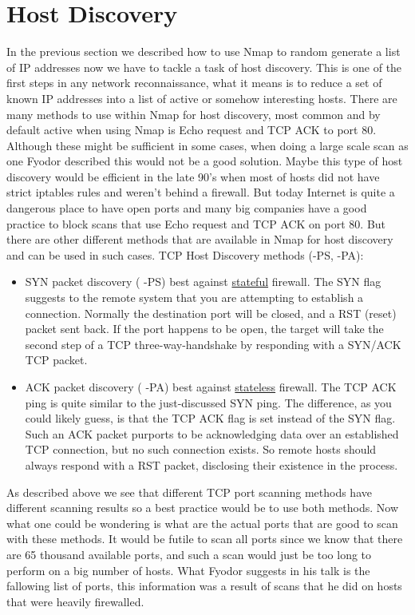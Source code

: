 \documentclass[times, utf8, seminar,english]{fer}
\begin{document}
\section{Host Discovery}
In the previous section we described how to use Nmap to random generate a list of IP addresses now we have to tackle a task of host discovery. This is one of the first steps in any network reconnaissance, what it means is to reduce a set of known IP addresses into a list of active or somehow interesting hosts. There are many methods to use within Nmap for host discovery, most common and by default active when using Nmap is Echo request and TCP ACK to port 80. Although these might be sufficient in some cases, when doing a large scale scan as one Fyodor described this would not be a good solution. Maybe this type of host discovery would be efficient in the late 90's when most of hosts did not have strict iptables rules and weren't behind a firewall. But today Internet is quite a dangerous place to have open ports and many big companies have a good practice to block scans that use Echo request and TCP ACK on port 80. But there are other different methods that are available in Nmap for host discovery and can be used in such cases. 
\newline\newline TCP Host Discovery methods (-PS, -PA):
\begin{itemize}
	\item SYN packet discovery ( -PS) best against \underline{stateful} firewall. The SYN flag suggests to the remote system that you are attempting to establish a connection. Normally the destination port will be closed, and a RST (reset) packet sent back. If the port happens to be open, the target will take the second step of a TCP three-way-handshake by responding with a SYN/ACK TCP packet.
	\item ACK packet discovery ( -PA) best against \underline{stateless} firewall. The TCP ACK ping is quite similar to the just-discussed SYN ping. The difference, as you could likely guess, is that the TCP ACK flag is set instead of the SYN flag. Such an ACK packet purports to be acknowledging data over an established TCP connection, but no such connection exists. So remote hosts should always respond with a RST packet, disclosing their existence in the process.
\end{itemize}
As described above we see that different TCP port scanning methods have different scanning results so a best practice would be to use both methods. Now what one could be wondering is what are the actual ports that are good to scan with these methods. It would be futile to scan all ports since we know that there are 65 thousand available ports, and such a scan would just be too long to perform on a big number of hosts. What Fyodor suggests in his talk is the fallowing list of ports, this information was a result of scans that he did on hosts that were heavily firewalled.
\end{document}
